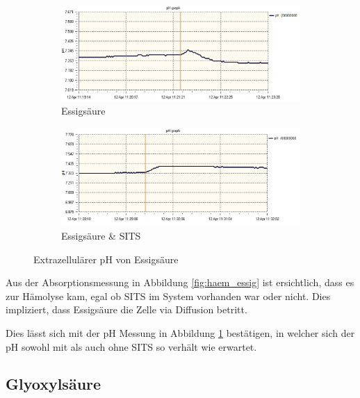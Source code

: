 \documentclass[a4paper,german]{scrreprt}
\begin{document}
\begin{figure}
	\centering
	\begin{subfigure}{.5\textwidth}
		\centering
		\includegraphics[width=\linewidth]{img/ph_essig.png}
		\caption{Essigsäure}
	\end{subfigure}%
	\begin{subfigure}{.5\textwidth}
		\centering
		\includegraphics[width=\linewidth]{img/ph_essig_sits.png}
		\caption{Essigsäure \& SITS}
	\end{subfigure}
	\caption{Extrazellulärer pH von Essigsäure}
	\label{fig:ph_essig}
\end{figure}

Aus der Absorptionsmessung in Abbildung \ref{fig:haem_essig} ist ersichtlich,
dass es zur Hämolyse kam, egal ob SITS im System vorhanden war oder nicht. Dies
impliziert, dass Essigsäure die Zelle via Diffusion betritt. 

Dies lässt sich mit der pH Messung in Abbildung \ref{fig:ph_essig} bestätigen,
in welcher sich der pH sowohl mit als auch ohne SITS so verhält wie erwartet.

\subsection{Glyoxylsäure}
\end{document}
